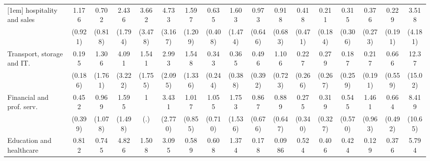 {\begin{tabular}{l*{16}{c}}
[1em]
hospitality and sales&       1.176         &       0.702         &       2.436         &       3.662         &       4.733\sym{*}  &       1.597         &       0.635         &       1.603         &       0.973         &       0.918         &       0.418         &       0.211         &       0.315         &       0.376         &       0.229         &       3.518         \\
                    &     (0.921)         &     (0.818)         &     (1.794)         &     (3.478)         &     (3.167)         &     (1.209)         &     (0.408)         &     (1.474)         &     (0.646)         &     (0.683)         &     (0.471)         &     (0.184)         &     (0.306)         &     (0.273)         &     (0.191)         &     (4.181)         \\
[1em]
Transport, storage and IT.&       0.195         &       1.306         &       4.091         &       1.541         &       2.993         &       1.548         &       0.343         &       0.365         &       0.496         &       1.106         &       0.227         &       0.279         &       0.187         &       0.217         &       0.666         &       12.37\sym{*}  \\
                    &     (0.186)         &     (1.761)         &     (3.222)         &     (1.755)         &     (2.095)         &     (1.336)         &     (0.244)         &     (0.388)         &     (0.392)         &     (0.723)         &     (0.266)         &     (0.267)         &     (0.259)         &     (0.191)         &     (0.559)         &     (15.02)         \\
[1em]
Financial and prof. serv.&       0.452         &       0.969         &       1.595         &           1         &       3.431         &       1.017         &       1.055         &       1.753         &       0.867         &       0.889         &       0.275         &       0.319         &       0.545         &       1.461         &       0.664         &       8.419         \\
                    &     (0.399)         &     (1.078)         &     (1.498)         &         (.)         &     (2.770)         &     (0.855)         &     (0.710)         &     (1.536)         &     (0.676)         &     (0.647)         &     (0.340)         &     (0.327)         &     (0.570)         &     (0.963)         &     (0.492)         &     (10.65)         \\
[1em]
Education and healthcare&       0.812         &       0.745         &       4.826\sym{*}  &       1.508         &       3.095         &       0.589         &       0.608         &       1.374         &       0.178         &      0.0986\sym{*}  &       0.524         &       0.406         &       0.424         &       0.129         &       0.376         &       5.794         \\

\end{tabular}}
